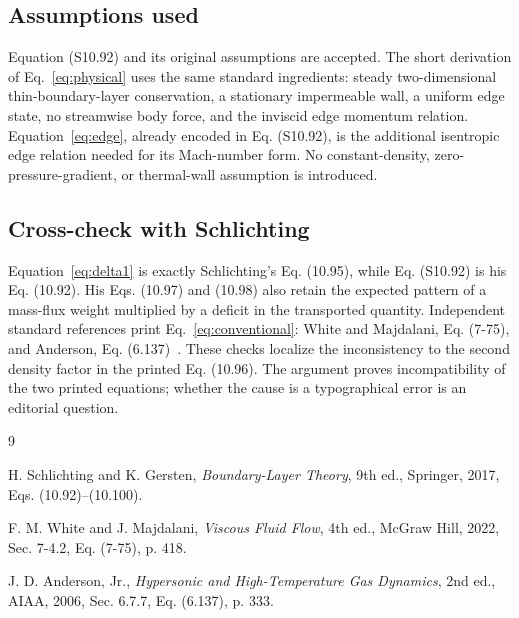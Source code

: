 \documentclass[11pt]{article}
\begin{document}
\subsection{Assumptions used}
Equation (S10.92) and its original assumptions are accepted. The short
derivation of Eq.~\eqref{eq:physical} uses the same standard ingredients:
steady two-dimensional thin-boundary-layer conservation, a stationary
impermeable wall, a uniform edge state, no streamwise body force, and the
inviscid edge momentum relation. Equation~\eqref{eq:edge}, already encoded in
Eq. (S10.92), is the additional isentropic edge relation needed for its
Mach-number form. No constant-density, zero-pressure-gradient, or thermal-wall
assumption is introduced.

\subsection{Cross-check with Schlichting}
\label{sec:cross-check}
Equation~\eqref{eq:delta1} is exactly Schlichting's Eq. (10.95), while
Eq. (S10.92) is his Eq. (10.92). His Eqs. (10.97) and (10.98) also retain the
expected pattern of a mass-flux weight multiplied by a deficit in the
transported quantity. Independent standard references print
Eq.~\eqref{eq:conventional}: White and Majdalani, Eq. (7-75), and Anderson,
Eq. (6.137)~\cite{White2022,Anderson2006}. These checks localize the
inconsistency to the second density factor in the printed Eq. (10.96). The
argument proves incompatibility of the two printed equations; whether the
cause is a typographical error is an editorial question.

\begin{thebibliography}{9}
\small

H. Schlichting and K. Gersten,
\emph{Boundary-Layer Theory}, 9th ed., Springer, 2017,
Eqs. (10.92)--(10.100).

F. M. White and J. Majdalani,
\emph{Viscous Fluid Flow}, 4th ed., McGraw Hill, 2022,
Sec. 7-4.2, Eq. (7-75), p. 418.

J. D. Anderson, Jr.,
\emph{Hypersonic and High-Temperature Gas Dynamics}, 2nd ed., AIAA, 2006,
Sec. 6.7.7, Eq. (6.137), p. 333.

\end{thebibliography}
\end{document}

